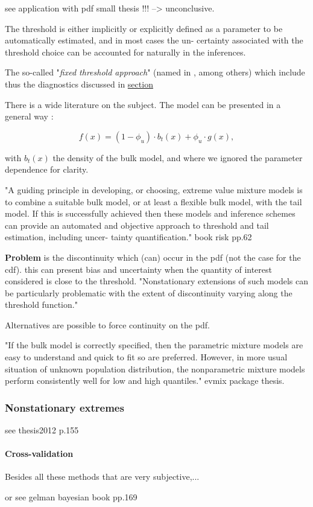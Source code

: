 see application with pdf small thesis !!! --> unconclusive.

The threshold is either implicitly or explicitly
defined as a parameter to be automatically estimated, and in most cases the un-
certainty associated with the threshold choice can be accounted for naturally in
the inferences.

The so-called "\emph{fixed threshold approach}" (named in 
\citet{hu_evmix:_2014}, among others) which include thus the 
diagnostics discussed in \hyperref[stdthr]{section \textbf{}}


There is a wide literature on the subject. The model can be presented in a general way : 

\begin{equation}
f(x)=(1-\phi_u)\cdot b_t(x)+\phi_u\cdot g(x),
\end{equation}

with $b_t(x)$ the density of the bulk model, and where we ignored the parameter dependence for clarity.

"A guiding principle in developing, or choosing, extreme value mixture models is to
combine a suitable bulk model, or at least a flexible bulk model, with the tail model. If
this is successfully achieved then these models and inference schemes can provide an
automated and objective approach to threshold and tail estimation, including uncer-
tainty quantification." book risk pp.62

\textbf{Problem} is the discontinuity which (can) occur in the pdf (not the case for the cdf). this can present bias and uncertainty when the quantity of interest considered is close to the threshold.
"Nonstationary extensions of such models can be particularly problematic
with the extent of discontinuity varying along the threshold function."

Alternatives are possible to force continuity on the pdf.

"If the bulk model is correctly specified, then the parametric
mixture models are easy to understand and quick to fit so are
preferred. However, in more usual situation of unknown
population distribution, the nonparametric mixture models
perform consistently well for low and high quantiles." evmix package thesis.


\subsubsection{Nonstationary extremes} see thesis2012 p.155

\paragraph*{Cross-validation}
\cite{northrop_cross_2016} 
Besides all these methods that are very subjective,...

or see gelman bayesian book pp.169